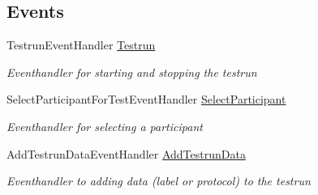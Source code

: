 \subsection*{Events}
\begin{DoxyCompactItemize}
\item 
Testrun\+Event\+Handler \hyperlink{class_web_analyzer_1_1_u_i_1_1_interaction_objects_1_1_testrun_control_aec90f2bc94369619608e0059453752d3}{Testrun}
\begin{DoxyCompactList}\small\item\em Eventhandler for starting and stopping the testrun \end{DoxyCompactList}\item 
Select\+Participant\+For\+Test\+Event\+Handler \hyperlink{class_web_analyzer_1_1_u_i_1_1_interaction_objects_1_1_testrun_control_abf256e52c1a039ca329f7c749a9087e4}{Select\+Participant}
\begin{DoxyCompactList}\small\item\em Eventhandler for selecting a participant \end{DoxyCompactList}\item 
Add\+Testrun\+Data\+Event\+Handler \hyperlink{class_web_analyzer_1_1_u_i_1_1_interaction_objects_1_1_testrun_control_ae68ced3ba48613d9aa1469c128e62419}{Add\+Testrun\+Data}
\begin{DoxyCompactList}\small\item\em Eventhandler to adding data (label or protocol) to the testrun \end{DoxyCompactList}\end{DoxyCompactItemize}
